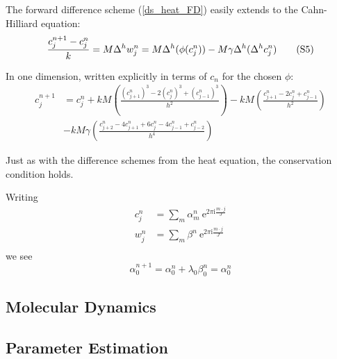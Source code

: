 \documentclass[12pt, reqno]{article}
\theoremstyle{definition}
\theoremstyle{remark}
\newcommand{\e}{\mathrm{e}}
\renewcommand{\i}{\mathrm{i}}
\begin{document}
The forward difference scheme (\ref{ds_heat_FD}) easily extends to the Cahn-Hilliard equation: 
\begin{equation} \label{ds_CH_FD}
	\frac{c_j^{n+1}-c_j^n}{k}=M\Delta^hw_j^n= M\Delta^h(\phi(c_j^n))-M\gamma\Delta^h(\Delta^h c_j^n){\tag{S5}}
\end{equation}

In one dimension, written explicitly in terms of $c_n$ for the chosen $\phi$: 
\begin{align*}
	c_j^{n+1}&=c_j^n+ kM\left(\frac{(c^n_{j+1})^3-2(c^n_j)^3+(c^n_{j-1})^3}{h^2}\right)-kM\left( \frac{c_{j+1}^n-2c_j^n+c_{j-1}^n}{h^2}\right)\\
	&-kM\gamma\left(\frac{c_{j+2}^n-4c_{j+1}^n+6c_j^n-4c_{j-1}^n+c_{j-2}^n}{h^4}\right)
\end{align*}






Just as with the difference schemes from the heat equation, the conservation condition holds.

Writing 
\begin{align*}
	c_j^n&=\sum_m\alpha_m^n~\e^{2\pi\i\frac{m\cdot j}{J}}\\
	w_j^n&=\sum_m\beta^n~\e^{2\pi\i\frac{m\cdot j}{J}}\\
\end{align*}
we see
\begin{equation*}
	\alpha_0^{n+1}=\alpha_0^n+\lambda_0\beta_0^n=\alpha_0^n
\end{equation*}

\subsection{Molecular Dynamics} \label{ssec_phase_MD}



\subsection{Parameter Estimation} \label{ssec_phase_estim}





\end{document}
